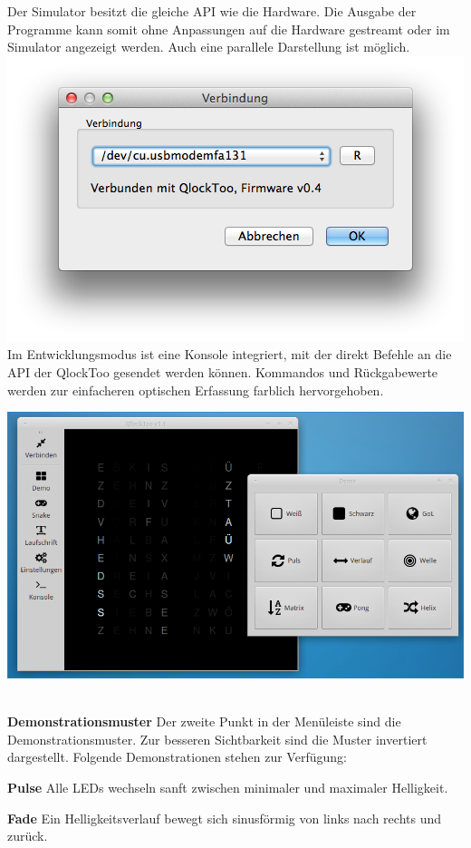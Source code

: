\begin{multicols}{2}
Der Simulator besitzt die gleiche API wie die Hardware. Die Ausgabe der Programme kann somit ohne Anpassungen auf die Hardware gestreamt oder im Simulator angezeigt werden. Auch eine parallele Darstellung ist möglich.
\includegraphics[width=\columnwidth]{Abbildungen/Software/ConnectDialog}
Im Entwicklungsmodus ist eine Konsole integriert, mit der direkt Befehle an die API der QlockToo gesendet werden können. Kommandos und Rückgabewerte werden zur einfacheren optischen Erfassung farblich hervorgehoben.

{
\centering
\includegraphics[width=0.9\columnwidth]{Abbildungen/Software/Linux}

}
\ \\
\textbf{Demonstrationsmuster} Der zweite Punkt in der Menüleiste sind die Demonstrationsmuster. Zur besseren Sichtbarkeit sind die Muster invertiert dargestellt. Folgende Demonstrationen stehen zur Verfügung:

\textbf{Pulse} Alle LEDs wechseln sanft zwischen minimaler und maximaler Helligkeit.

\textbf{Fade} Ein Helligkeitsverlauf bewegt sich sinusförmig von links nach rechts und zurück.


\end{multicols}

